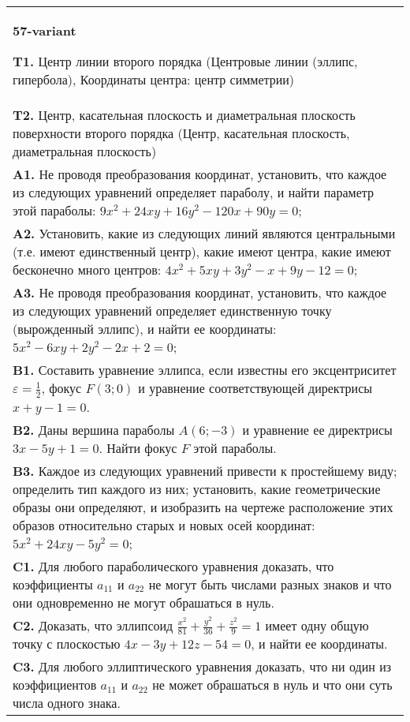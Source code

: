 \documentclass{article}
\begin{document}
\begin{tabular}{m{17cm}}
\textbf{57-variant}
\newline

\textbf{T1.} Центр линии второго порядка (Центровые линии (эллипс, гипербола), Координаты центра: центр симметрии) \\
\textbf{T2.} Центр, касательная плоскость и диаметральная плоскость поверхности второго порядка (Центр, касательная плоскость, диаметральная плоскость) \\
\textbf{A1.} Не проводя преобразования координат, установить, что каждое из следующих уравнений определяет параболу, и найти параметр этой параболы: $9 x^2+24 x y+16 y^2-120 x+90 y=0$; \\
\textbf{A2.} Установить, какие из следующих линий являются центральными (т.е. имеют единственный центр), какие имеют центра, какие имеют бесконечно много центров: $4 x^2+5 x y+3 y^2-x+9 y-12=0$; \\
\textbf{A3.} Не проводя преобразования координат, установить, что каждое из следующих уравнений определяет единственную точку (вырожденный эллипс), и найти ее координаты: $5 x^2-6 x y+2 y^2-2 x+2=0$; \\
\textbf{B1.} Составить уравнение эллипса, если известны его эксцентриситет $\varepsilon=\frac{1}{2}$, фокус $F(3 ; 0)$ и уравнение соответствующей директрисы $x+y-1=0$. \\
\textbf{B2.} Даны вершина параболы $A(6 ;-3)$ и уравнение ее директрисы $3 x-5 y+1=0$. Найти фокус $F$ этой параболы. \\
\textbf{B3.} Каждое из следующих уравнений привести к простейшему виду; определить тип каждого из них; установить, какие геометрические образы они определяют, и изобразить на чертеже расположение этих образов относительно старых и новых осей координат: $5 x^2+24 x y-5 y^2=0$; \\
\textbf{C1.} Для любого параболического уравнения доказать, что коэффициенты $a_{11}$ и $a_{22}$ не могут быть числами разных знаков и что они одновременно не могут обрашаться в нуль. \\
\textbf{C2.} Доказать, что эллипсоид $\frac{x^2}{81}+\frac{y^2}{36}+\frac{z^2}{9}=1$ имеет одну общую точку с плоскостью $4 x-3 y+12 z-54=0$, и найти ее координаты. \\
\textbf{C3.} Для любого эллиптического уравнения доказать, что ни один из коэффициентов $a_{11}$ и $a_{22}$ не может обрашаться в нуль и что они суть числа одного знака. \\

\end{tabular}
\vspace{1cm}
\end{document}
